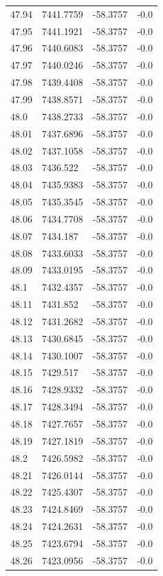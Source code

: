 \begin{table}[H]
\begin{tabular}{llll}
47.94 & 7441.7759 & -58.3757 & -0.0 \\
47.95 & 7441.1921 & -58.3757 & -0.0 \\
47.96 & 7440.6083 & -58.3757 & -0.0 \\
47.97 & 7440.0246 & -58.3757 & -0.0 \\
47.98 & 7439.4408 & -58.3757 & -0.0 \\
47.99 & 7438.8571 & -58.3757 & -0.0 \\
48.0 & 7438.2733 & -58.3757 & -0.0 \\
48.01 & 7437.6896 & -58.3757 & -0.0 \\
48.02 & 7437.1058 & -58.3757 & -0.0 \\
48.03 & 7436.522 & -58.3757 & -0.0 \\
48.04 & 7435.9383 & -58.3757 & -0.0 \\
48.05 & 7435.3545 & -58.3757 & -0.0 \\
48.06 & 7434.7708 & -58.3757 & -0.0 \\
48.07 & 7434.187 & -58.3757 & -0.0 \\
48.08 & 7433.6033 & -58.3757 & -0.0 \\
48.09 & 7433.0195 & -58.3757 & -0.0 \\
48.1 & 7432.4357 & -58.3757 & -0.0 \\
48.11 & 7431.852 & -58.3757 & -0.0 \\
48.12 & 7431.2682 & -58.3757 & -0.0 \\
48.13 & 7430.6845 & -58.3757 & -0.0 \\
48.14 & 7430.1007 & -58.3757 & -0.0 \\
48.15 & 7429.517 & -58.3757 & -0.0 \\
48.16 & 7428.9332 & -58.3757 & -0.0 \\
48.17 & 7428.3494 & -58.3757 & -0.0 \\
48.18 & 7427.7657 & -58.3757 & -0.0 \\
48.19 & 7427.1819 & -58.3757 & -0.0 \\
48.2 & 7426.5982 & -58.3757 & -0.0 \\
48.21 & 7426.0144 & -58.3757 & -0.0 \\
48.22 & 7425.4307 & -58.3757 & -0.0 \\
48.23 & 7424.8469 & -58.3757 & -0.0 \\
48.24 & 7424.2631 & -58.3757 & -0.0 \\
48.25 & 7423.6794 & -58.3757 & -0.0 \\
48.26 & 7423.0956 & -58.3757 & -0.0 \\

\end{tabular}
\end{table}
